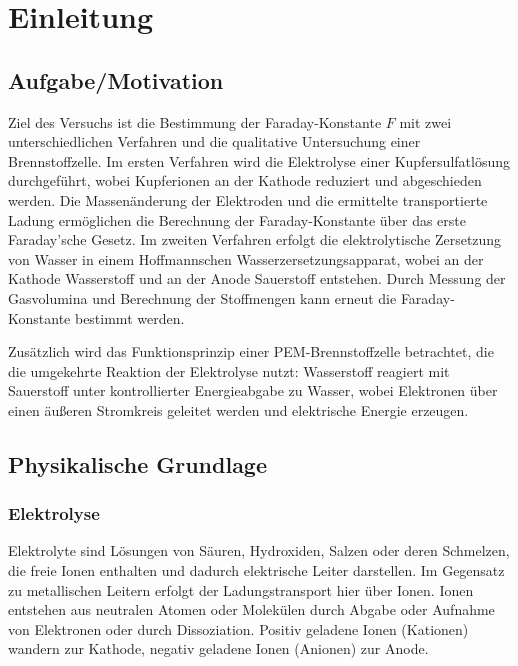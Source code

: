 \chapter{Einleitung}

\section{Aufgabe/Motivation}

Ziel des Versuchs ist die Bestimmung der Faraday-Konstante $F$ mit zwei unterschiedlichen Verfahren und die qualitative Untersuchung einer Brennstoffzelle. Im ersten Verfahren wird die Elektrolyse einer Kupfersulfatlösung durchgeführt, wobei Kupferionen an der Kathode reduziert und abgeschieden werden. Die Massenänderung der Elektroden und die ermittelte transportierte Ladung ermöglichen die Berechnung der Faraday-Konstante über das erste Faraday’sche Gesetz. Im zweiten Verfahren erfolgt die elektrolytische Zersetzung von Wasser in einem Hoffmannschen Wasserzersetzungsapparat, wobei an der Kathode Wasserstoff und an der Anode Sauerstoff entstehen. Durch Messung der Gasvolumina und Berechnung der Stoffmengen kann erneut die Faraday-Konstante bestimmt werden.

Zusätzlich wird das Funktionsprinzip einer PEM-Brennstoffzelle betrachtet, die die umgekehrte Reaktion der Elektrolyse nutzt: Wasserstoff reagiert mit Sauerstoff unter kontrollierter Energieabgabe zu Wasser, wobei Elektronen über einen äußeren Stromkreis geleitet werden und elektrische Energie erzeugen.

\section{Physikalische Grundlage}

\cite{demtroeder17,skript25}

\subsection{Elektrolyse}

Elektrolyte sind Lösungen von Säuren, Hydroxiden, Salzen oder deren Schmelzen, die freie Ionen enthalten und dadurch elektrische Leiter darstellen. Im Gegensatz zu metallischen Leitern erfolgt der Ladungstransport hier über Ionen. Ionen entstehen aus neutralen Atomen oder Molekülen durch Abgabe oder Aufnahme von Elektronen oder durch Dissoziation. Positiv geladene Ionen (Kationen) wandern zur Kathode, negativ geladene Ionen (Anionen) zur Anode.  


